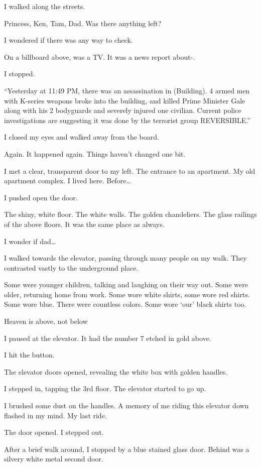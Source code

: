 I walked along the streets.

Princess, Ken, Tam, Dad. Was there anything left?

I wondered if there was any way to check.

On a billboard above, was a TV. It was a news report about-.

I stopped.

“Yesterday at 11:49 PM, there was an assassination in (Building). 4 armed men with K-series weapons broke into the building, and killed Prime Minister Gale along with his 2 bodyguards and severely injured one civilian. Current police investigations are suggesting it was done by the terrorist group REVERSIBLE.”

I closed my eyes and walked away from the board. 

Again. It happened again. Things haven’t changed one bit.

I met a clear, transparent door to my left. The entrance to an apartment. My old apartment complex. I lived here. Before…

I pushed open the door.

The shiny, white floor. The white walls. The golden chandeliers. The glass railings of the above floors. It was the same place as always.

I wonder if dad…

I walked towards the elevator, passing through many people on my walk. They contrasted vastly to the underground place. 

Some were younger children, talking and laughing on their way out. Some were older, returning home from work. Some wore white shirts, some wore red shirts. Some wore blue. There were countless colors. Some wore ‘our’ black shirts too.

Heaven is above, not below

I paused at the elevator. It had the number 7 etched in gold above.

I hit the button.

The elevator doors opened, revealing the white box with golden handles.

I stepped in, tapping the 3rd floor. The elevator started to go up.

I brushed some dust on the handles. A memory of me riding this elevator down flashed in my mind. My last ride.

The door opened. I stepped out.

After a brief walk around, I stopped by a blue stained glass door. Behind was a silvery white metal second door.

